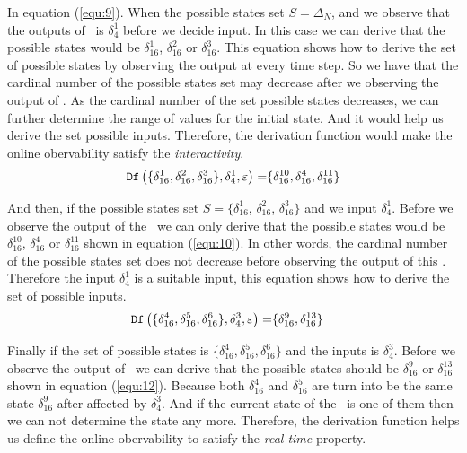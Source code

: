 \begin{example}
In equation (\ref{equ:9}). When the possible states set $S=\Delta_N$, and  we observe that the outputs of \BCN\ is $\delta_4^1$ before we decide input. In this case we can derive that the possible states would be $\delta_{16}^1$, $\delta_{16}^2$ or  $\delta_{16}^3$. This equation shows how to derive the set of possible states by observing the output at every time step. So we have that the cardinal number of the possible states set may decrease after we observing the output of \BCN. As the cardinal number of the set possible states decreases, we can further determine the range of values for the initial state. And it would help us derive the set possible inputs. Therefore, the derivation function would make the online obervability satisfy the {\em interactivity}.
\begin{equation}
\begin{split}
{\tt Df}\left(\{\delta_{16}^1,\delta_{16}^2,\delta_{16}^3\},\delta_4^1,\varepsilon\right)=&\{\delta_{16}^{10},\delta_{16}^4,\delta_{16}^{11}\}\\
\end{split}
\label{equ:10}
\end{equation}

And then, if the possible states set $S=\{\delta_{16}^1$, $\delta_{16}^2$, $\delta_{16}^3\}$ and we input $\delta_4^1$. Before we observe the output of the \BCN\ we can only derive that the possible states would be $\delta_{16}^{10}$, $\delta_{16}^4$ or  $\delta_{16}^{11}$ shown in equation (\ref{equ:10}). In other words, the cardinal number of the possible states set does not decrease before observing the output of this \BCN. Therefore the input $\delta_4^1$ is a suitable input, this equation shows how to derive the set of possible inputs.
\begin{equation}
\begin{split}
{\tt Df}\left(\{\delta_{16}^4,\delta_{16}^5,\delta_{16}^6\},\delta_4^3,\varepsilon\right)=&\{\delta_{16}^9,\delta_{16}^{13}\}
\end{split}
\label{equ:12}
\end{equation}

 Finally if the set of possible states is $\{\delta_{16}^4,\delta_{16}^5,\delta_{16}^6\}$ and the inputs is $\delta_4^3$. Before we observe the output of \BCN\ we can derive that the possible states should be $\delta_{16}^9$ or $\delta_{16}^{13}$ shown in equation (\ref{equ:12}). Because both $\delta_{16}^4$ and $\delta_{16}^5$ are turn into be the same state $\delta_{16}^9$ after affected by $\delta_4^3$. And if the current state of the \BCN\ is one of them then we can not determine the  state any more. Therefore, the derivation function helps us define the online obervability to satisfy the {\em real-time} property. 
 \end{example}   
 
